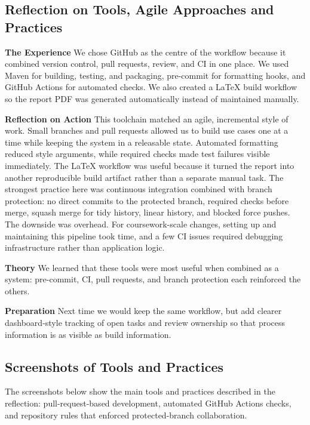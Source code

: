 \documentclass[11pt,a4paper]{article}
\begin{document}
\subsection{Reflection on Tools, Agile Approaches and Practices}

\noindent
\textbf{The Experience}
We chose GitHub as the centre of the workflow because it combined version control, pull requests, review, and CI in one place. We used Maven for building, testing, and packaging, pre-commit for formatting hooks, and GitHub Actions for automated checks. We also created a LaTeX build workflow so the report PDF was generated automatically instead of maintained manually.

\textbf{Reflection on Action}
This toolchain matched an agile, incremental style of work. Small branches and pull requests allowed us to build use cases one at a time while keeping the system in a releasable state. Automated formatting reduced style arguments, while required checks made test failures visible immediately. The LaTeX workflow was useful because it turned the report into another reproducible build artifact rather than a separate manual task. The strongest practice here was continuous integration combined with branch protection: no direct commits to the protected branch, required checks before merge, squash merge for tidy history, linear history, and blocked force pushes. The downside was overhead. For coursework-scale changes, setting up and maintaining this pipeline took time, and a few CI issues required debugging infrastructure rather than application logic.

\textbf{Theory}
We learned that these tools were most useful when combined as a system: pre-commit, CI, pull requests, and branch protection each reinforced the others.

\textbf{Preparation}
Next time we would keep the same workflow, but add clearer dashboard-style tracking of open tasks and review ownership so that process information is as visible as build information.

\subsection{Screenshots of Tools and Practices}

The screenshots below show the main tools and practices described in the reflection:
pull-request-based development, automated GitHub Actions checks, and repository rules
that enforced protected-branch collaboration.
\end{document}

